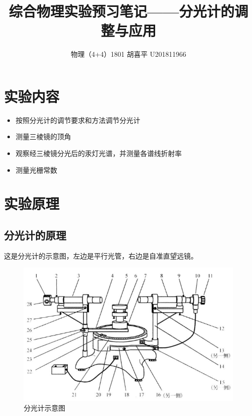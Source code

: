 \documentclass{article}
\author{物理（4+4）1801 \quad  胡喜平 \quad U201811966}
\affil{个人网站 https://hxp.plus/ \quad 电子邮件 hxp201406@gmail.com}
\title{综合物理实验预习笔记——分光计的调整与应用}
\begin{document}
\maketitle\thispagestyle{fancy}

\section{实验内容}

\begin{itemize}
\item 按照分光计的调节要求和方法调节分光计
\item 测量三棱镜的顶角
\item 观察经三棱镜分光后的汞灯光谱，并测量各谱线折射率
\item 测量光栅常数
\end{itemize}

\section{实验原理}

\subsection{分光计的原理}

这是分光计的示意图，左边是平行光管，右边是自准直望远镜。

\begin{figure}[H]
  \centering
  \includegraphics[width=0.8\linewidth]{figures/分光计示意图}
  \caption{分光计示意图}
  \label{fig:分光计示意图}
\end{figure}
\end{document}

